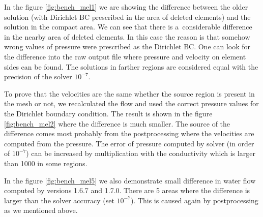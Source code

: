 In the figure \ref{fig:bench_mel1} we are showing the difference between the older solution (with Dirichlet BC 
prescribed in the area of deleted elements) and the solution in the compact area. We can see that there is a~considerable 
difference in the nearby area of deleted elements. In this case the reason is that somehow wrong values 
of pressure were prescribed as the Dirichlet BC. One can look for the difference into the raw output file 
where pressure and velocity on element sides can be found. The solutions in farther regions are considered equal 
with the precision of the solver $10^{-7}$.

To prove that the velocities are the same whether the source region is present in the mesh or not, we recalculated the flow and used the correct pressure values
for the Dirichlet boundary condition. The result is shown in the figure \ref{fig:bench_mel2} where the difference is much smaller.
The source of the difference comes most probably from the postprocessing where the velocities are computed from the pressure. 
The error of pressure computed by solver (in order of $10^{-7}$) can be increased by multiplication with the conductivity
which is larger than 1000 in some regions.



In the figure \ref{fig:bench_mel5} we also demonstrate small difference in water flow computed by versions 1.6.7 and 1.7.0. 
There are 5 areas where the difference is larger than the solver accuracy (set $10^{-7}$). This is caused again by 
postprocessing as we mentioned above.

